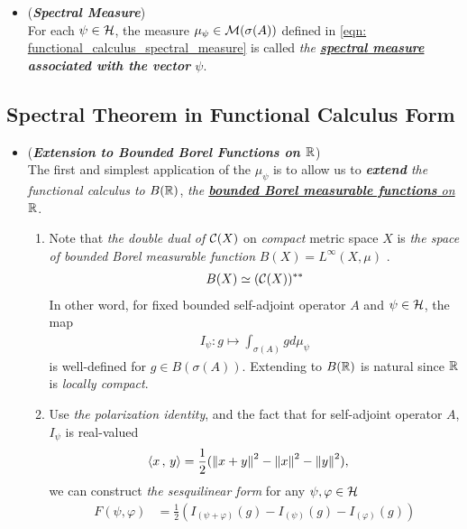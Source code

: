 \documentclass[11pt]{article}
\begin{document}
\begin{itemize}
\item 
\begin{definition} (\emph{\textbf{Spectral Measure}})\\
For each $\psi \in {\mathcal H}$, the measure $\mu_{\psi} \in {\mathcal M}(\sigma(A))$ defined in \eqref{eqn: functional_calculus_spectral_measure} is called \emph{the \underline{\textbf{spectral measure}} \textbf{associated with the vector} $\psi$}. 
\end{definition}
\end{itemize}

\subsection{Spectral Theorem in Functional Calculus Form}
\begin{itemize}
\item \begin{remark} (\emph{\textbf{Extension to Bounded Borel Functions on ${\mathbb R}$}}) \citep{reed1980methods}\\
The first and simplest application of the $\mu_{\psi}$ is to allow us to \emph{\textbf{extend} the functional calculus to $B({\mathbb R})$}, \emph{the \underline{\textbf{bounded Borel measurable functions} on ${\mathbb R}$}}. 
\begin{enumerate}
\item Note that \emph{the double dual of ${\mathcal C}(X)$} on \emph{compact} metric space $X$ is \emph{the space of bounded Borel measurable function} $B(X) = L^{\infty}(X, \mu)$ \citep{lax2002functional}.
\begin{align*}
B(X) \simeq ({\mathcal C}(X))^{**}
\end{align*}
In other word, for fixed bounded self-adjoint operator $A$ and $\psi \in {\mathcal H}$, the map 
\begin{align*}
I_{\psi}: g \mapsto \int_{\sigma(A)} g d\mu_{\psi} 
\end{align*} is well-defined for $g \in B(\sigma(A))$. Extending to $B({\mathbb R})$ is natural since ${\mathbb R}$ is \emph{locally compact}. 
\item Use  \emph{the polarization identity}, and the fact that for self-adjoint operator $A$, $I_{\psi}$ is real-valued 
\begin{align*}
\left\langle x\,,\, y \right\rangle &= \frac{1}{2}(\left\|x + y\right\|_{}^2 - \left\|x\right\|_{}^2 - \left\|y\right\|_{}^2),
\end{align*}
we can construct \emph{the sesquilinear form} for any $\psi, \varphi \in {\mathcal H}$
\begin{align*}
F(\psi, \varphi) &=\frac{1}{2} ( I_{(\psi+\varphi)}(g) - I_{(\psi)}(g) -  I_{(\varphi)}(g) )

\end{align*}
\end{enumerate}
\end{remark}
\end{itemize}
\end{document}
